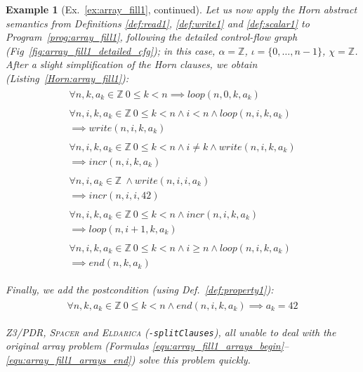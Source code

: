 \documentclass[a4paper]{article}
\newcommand{\ZZ}{\mathbb{Z}}
\newcommand{\soft}[1]{\textsc{#1}}
\theoremstyle{definition}
\theoremstyle{plain}
\newtheorem*{example*}{Example}
\newcommand{\rulespacing}{\\[0.4em]}
\begin{document}
\begin{example*}[Ex.~\ref{ex:array_fill1}, continued]
Let us now apply the Horn abstract semantics from Definitions \ref{def:read1}, \ref{def:write1} and \ref{def:scalar1} to Program~\ref{prog:array_fill1}, following the detailed control-flow graph (Fig~\ref{fig:array_fill1_detailed_cfg});
in this case, $\alpha = \ZZ$, $\iota = \{ 0,\dots,n-1 \}$, $\chi = \ZZ$.
After a slight simplification of the Horn clauses, we obtain (Listing~\ref{Horn:array_fill1}):
{\small\begin{align}
\begin{aligned}
\forall n,k,a_k \in \ZZ~ 0 \leq k < n \implies \mathit{loop}(n,0,k,a_k)
\end{aligned}\label{rule:array_fill1_begin}\\
\begin{aligned}
\forall n,i,k,a_k \in \ZZ~ 0 \leq k < n \land i < n \land
\mathit{loop}(n,i,k,a_k)\\ \implies \mathit{write}(n,i,k,a_k)
\end{aligned}\rulespacing
\begin{aligned}
\forall n,i,k,a_k \in \ZZ~ 0 \leq k < n \land i \neq k \land
\mathit{write}(n,i,k,a_k)\\ \implies \mathit{incr}(n,i,k,a_k)
\end{aligned}\rulespacing
\begin{aligned}
\forall n,i,a_k \in \ZZ~ \land
\mathit{write}(n,i,i,a_k)\\ \implies \mathit{incr}(n,i,i,42)
\end{aligned}\rulespacing
\begin{aligned}
\forall n,i,k,a_k \in \ZZ~ 0 \leq k < n \land
\mathit{incr}(n,i,k,a_k)\\ \implies \mathit{loop}(n,i+1,k,a_k)
\end{aligned}\rulespacing
\begin{aligned}
\forall n,i,k,a_k \in \ZZ~ 0 \leq k < n \land i \geq n \land
\mathit{loop}(n,i,k,a_k)\\ \implies \mathit{end}(n,k,a_k)
\end{aligned}\label{rule:array_fill1_end}
\end{align}}

Finally, we add the postcondition (using Def.~\ref{def:property1}):
\begin{align}
\begin{aligned}
\forall n,k,a_k \in \ZZ~ 0 \leq k < n \land
\mathit{end}(n,i,k,a_k) \implies a_k = 42
\end{aligned}
\end{align}

Z3/PDR, \soft{Spacer} and \soft{Eldarica} (\verb+-splitClauses+), all unable to deal with the original array problem (Formulas \ref{equ:array_fill1_arrays_begin}--\ref{equ:array_fill1_arrays_end}) solve this problem quickly.
\end{example*}
\end{document}
